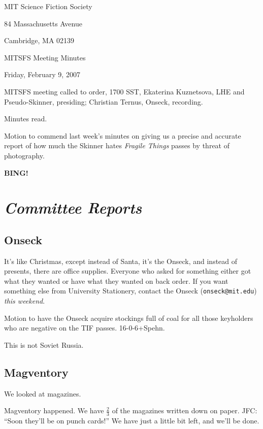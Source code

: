 \documentclass[10pt]{article}
\newcommand{\bing}{{\bf BING!} }
\newcommand{\goto}[1]{\bing \vskip 12pt \section*{{\em{#1}}}}
\begin{document}
\begin{center}

MIT Science Fiction Society

84 Massachusetts Avenue

Cambridge, MA 02139

\vspace{12pt}

MITSFS Meeting Minutes

Friday, February 9, 2007

\end{center}

\vspace{18pt}

\setlength{\parskip}{6pt}

\noindent
MITSFS meeting called to order, 1700 SST,
Ekaterina Kuznetsova, LHE and Pseudo-Skinner, presiding; Christian Ternus, Onseck, recording.

Minutes read.

Motion to commend last week's minutes on giving us a precise and accurate report of how much the Skinner hates \emph{Fragile Things} passes by threat of photography.

\goto{Committee Reports}

\subsection*{Onseck}

It's like Christmas, except instead of Santa, it's the Onseck, and instead of presents, there are office supplies.  Everyone who asked for something either got what they wanted or have what they wanted on back order.  If you want something else from University Stationery, contact the Onseck {(\texttt{onseck@mit.edu}}) \emph{this weekend}.

Motion to have the Onseck acquire stockings full of coal for all those keyholders who are negative on the TIF passes. 16-0-6+Spehn.

This is not Soviet Russia.

\subsection*{Magventory}

We looked at magazines.

Magventory happened.  We have $\frac{2}{3}$ of the magazines written down on paper.  JFC: ``Soon they'll be on punch cards!''  We have just a little bit left, and we'll be done.
\end{document}
